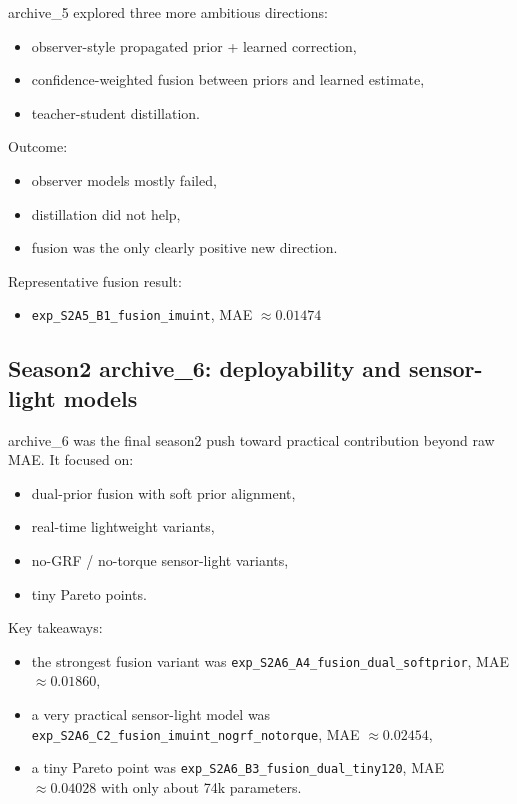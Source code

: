 \documentclass[11pt,a4paper]{article}
\begin{document}
archive\_5 explored three more ambitious directions:

\begin{itemize}
\item observer-style propagated prior + learned correction,
\item confidence-weighted fusion between priors and learned estimate,
\item teacher-student distillation.
\end{itemize}

Outcome:

\begin{itemize}
\item observer models mostly failed,
\item distillation did not help,
\item fusion was the only clearly positive new direction.
\end{itemize}

Representative fusion result:

\begin{itemize}
\item \texttt{exp\_S2A5\_B1\_fusion\_imuint}, MAE \(\approx 0.01474\)
\end{itemize}

\subsection{Season2 archive\_6: deployability and sensor-light models}

archive\_6 was the final season2 push toward practical contribution beyond raw MAE. It focused on:

\begin{itemize}
\item dual-prior fusion with soft prior alignment,
\item real-time lightweight variants,
\item no-GRF / no-torque sensor-light variants,
\item tiny Pareto points.
\end{itemize}

Key takeaways:

\begin{itemize}
\item the strongest fusion variant was \texttt{exp\_S2A6\_A4\_fusion\_dual\_softprior}, MAE \(\approx 0.01860\),
\item a very practical sensor-light model was \texttt{exp\_S2A6\_C2\_fusion\_imuint\_nogrf\_notorque}, MAE \(\approx 0.02454\),
\item a tiny Pareto point was \texttt{exp\_S2A6\_B3\_fusion\_dual\_tiny120}, MAE \(\approx 0.04028\) with only about 74k parameters.
\end{itemize}
\end{document}
